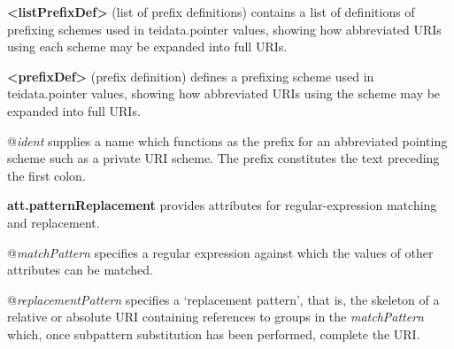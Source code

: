\begin{sansreflist}
  
\item [\textbf{<listPrefixDef>}] (list of prefix definitions) contains a list of definitions of prefixing schemes used in \textsf{teidata.pointer} values, showing how abbreviated URIs using each scheme may be expanded into full URIs.
\item [\textbf{<prefixDef>}] (prefix definition) defines a prefixing scheme used in \textsf{teidata.pointer} values, showing how abbreviated URIs using the scheme may be expanded into full URIs.\hfil\\[-10pt]\begin{sansreflist}
    \item[@{\itshape ident}]
  supplies a name which functions as the prefix for an abbreviated pointing scheme such as a private URI scheme. The prefix constitutes the text preceding the first colon.
\end{sansreflist}  
\item [\textbf{att.patternReplacement}] provides attributes for regular-expression matching and replacement.\hfil\\[-10pt]\begin{sansreflist}
    \item[@{\itshape matchPattern}]
  specifies a regular expression against which the values of other attributes can be matched.
    \item[@{\itshape replacementPattern}]
  specifies a ‘replacement pattern’, that is, the skeleton of a relative or absolute URI containing references to groups in the {\itshape matchPattern} which, once subpattern substitution has been performed, complete the URI.
\end{sansreflist}  
\end{sansreflist}
\par
